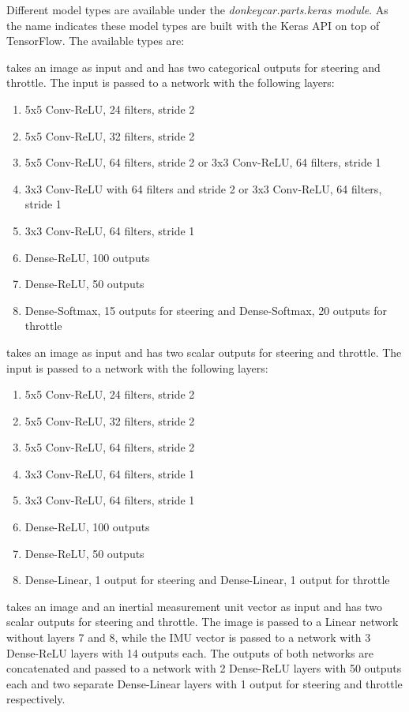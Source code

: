 \documentclass[conference]{IEEEtran}
\begin{document}
Different model types are available under the \textit{donkeycar.parts.keras module}.
As the name indicates these model types are built with the Keras API on top of TensorFlow.
The available types are:
\begin{description}
\setlength\itemsep{.25em}
\item[Categorical] takes an image as input and and has two categorical outputs for steering and throttle. The input is passed to a network with the following layers:
\begin{enumerate}
\item
5x5 Conv-ReLU, 24 filters, stride 2
\item
5x5 Conv-ReLU, 32 filters, stride 2
\item
5x5 Conv-ReLU, 64 filters, stride 2 or 3x3 Conv-ReLU, 64 filters, stride 1
\item
3x3 Conv-ReLU with 64 filters and stride 2 or 3x3 Conv-ReLU, 64 filters, stride 1
\item
3x3 Conv-ReLU, 64 filters, stride 1
\item
Dense-ReLU, 100 outputs
\item
Dense-ReLU, 50 outputs
\item
Dense-Softmax, 15 outputs for steering and Dense-Softmax, 20 outputs for throttle
\end{enumerate}
\item[Linear] takes an image as input and has two scalar outputs for steering and throttle. The input is passed to a network with the following layers:
\begin{enumerate}
\item
5x5 Conv-ReLU, 24 filters, stride 2
\item
5x5 Conv-ReLU, 32 filters, stride 2
\item
5x5 Conv-ReLU, 64 filters, stride 2
\item
3x3 Conv-ReLU, 64 filters, stride 1
\item
3x3 Conv-ReLU, 64 filters, stride 1
\item
Dense-ReLU, 100 outputs
\item
Dense-ReLU, 50 outputs
\item
Dense-Linear, 1 output for steering and Dense-Linear, 1 output for throttle
\end{enumerate}
\item[IMU] takes an image and an inertial measurement unit vector as input and has two scalar outputs for steering and throttle. The image is passed to a Linear network without layers 7 and 8, while the IMU vector is passed to a network with 3 Dense-ReLU layers with 14 outputs each. The outputs of both networks are concatenated and passed to a network with 2 Dense-ReLU layers with 50 outputs each and two separate Dense-Linear layers with 1 output for steering and throttle respectively.

\end{description}
\end{document}

